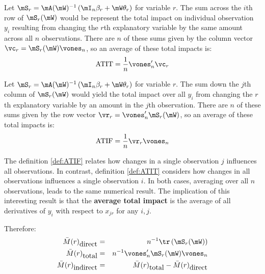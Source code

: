 \documentclass[english,12pt]{book}\usepackage[]{graphicx}\usepackage[]{xcolor}
\begin{document}
\begin{definition}\label{def:ATIT}
	Let $\mS_r = \mA(\mW)^{-1}\left(\mI_n\beta_r + \mW\theta_r\right)$ for variable $r$. The sum across the $i$th row of $\mS_r(\mW)$ would be represent the total impact on individual observation $y_i$ resulting from changing the $r$th explanatory variable by the same amount across all $n$ observations. There are $n$ of these sums given by the column vector $\vc_r = \mS_r(\mW)\vones_n$, so an average of these total impacts is:
	\begin{equation}
		\mbox{ATIT} = \frac{1}{n} \vones_n'\vc_r
		\end{equation} 
\end{definition}

\begin{definition}\label{def:ATIF}
	Let $\mS_r = \mA(\mW)^{-1}\left(\mI_n\beta_r + \mW\theta_r\right)$ for variable $r$. The sum down the $j$th column of $\mS_r(\mW)$ would yield the total impact over all $y_i$ from changing the $r$th explanatory variable by an amount in the $j$th observation. There are $n$ of these sums given by the row vector $\vr_r = \vones_n'\mS_{r}(\mW)$, so an average of these total impacts is:
\begin{equation}
				\mbox{ATIF} = \frac{1}{n} \vr_r\vones_n
				\end{equation} 
\end{definition}

The definition \ref{def:ATIF} relates how changes in a single observation $j$ influences all observations. In contrast, definition \ref{def:ATIT} considers how changes in all observations influences a single observation $i$. In both cases, averaging over all $n$ observations, leads to the same numerical result. The implication of this interesting result is that the \textbf{average total impact} is the average of all derivatives of $y_i$ with respect to $x_{jr}$ for any $i, j$. 

Therefore:
\begin{eqnarray}
\bar{M}(r)_{\mbox{direct}} & = & n^{-1}\tr\left(\mS_r(\mW)\right) \\
\bar{M}(r)_{\mbox{total}} & = & n^{-1}\vones_n'\mS_r(\mW)\vones_n \\
\bar{M}(r)_{\mbox{indirect}} & = & \bar{M}(r)_{\mbox{total}} - \bar{M}(r)_{\mbox{direct}}
\end{eqnarray}	
\end{document}
